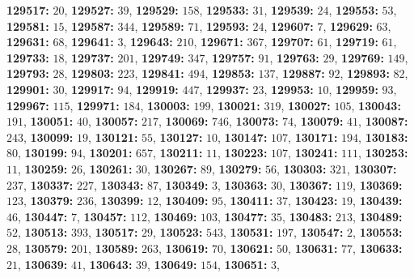 \textsf{\bfseries 129517:} $20$, \textsf{\bfseries 129527:} $39$, \textsf{\bfseries 129529:} $158$, \textsf{\bfseries 129533:} $31$, \textsf{\bfseries 129539:} $24$, \textsf{\bfseries 129553:} $53$, \textsf{\bfseries 129581:} $15$, \textsf{\bfseries 129587:} $344$, \textsf{\bfseries 129589:} $71$, \textsf{\bfseries 129593:} $24$, \textsf{\bfseries 129607:} $7$, \textsf{\bfseries 129629:} $63$, \textsf{\bfseries 129631:} $68$, \textsf{\bfseries 129641:} $3$, \textsf{\bfseries 129643:} $210$, \textsf{\bfseries 129671:} $367$, \textsf{\bfseries 129707:} $61$, \textsf{\bfseries 129719:} $61$, \textsf{\bfseries 129733:} $18$, \textsf{\bfseries 129737:} $201$, \textsf{\bfseries 129749:} $347$, \textsf{\bfseries 129757:} $91$, \textsf{\bfseries 129763:} $29$, \textsf{\bfseries 129769:} $149$, \textsf{\bfseries 129793:} $28$, \textsf{\bfseries 129803:} $223$, \textsf{\bfseries 129841:} $494$, \textsf{\bfseries 129853:} $137$, \textsf{\bfseries 129887:} $92$, \textsf{\bfseries 129893:} $82$, \textsf{\bfseries 129901:} $30$, \textsf{\bfseries 129917:} $94$, \textsf{\bfseries 129919:} $447$, \textsf{\bfseries 129937:} $23$, \textsf{\bfseries 129953:} $10$, \textsf{\bfseries 129959:} $93$, \textsf{\bfseries 129967:} $115$, \textsf{\bfseries 129971:} $184$, \textsf{\bfseries 130003:} $199$, \textsf{\bfseries 130021:} $319$, \textsf{\bfseries 130027:} $105$, \textsf{\bfseries 130043:} $191$, \textsf{\bfseries 130051:} $40$, \textsf{\bfseries 130057:} $217$, \textsf{\bfseries 130069:} $746$, \textsf{\bfseries 130073:} $74$, \textsf{\bfseries 130079:} $41$, \textsf{\bfseries 130087:} $243$, \textsf{\bfseries 130099:} $19$, \textsf{\bfseries 130121:} $55$, \textsf{\bfseries 130127:} $10$, \textsf{\bfseries 130147:} $107$, \textsf{\bfseries 130171:} $194$, \textsf{\bfseries 130183:} $80$, \textsf{\bfseries 130199:} $94$, \textsf{\bfseries 130201:} $657$, \textsf{\bfseries 130211:} $11$, \textsf{\bfseries 130223:} $107$, \textsf{\bfseries 130241:} $111$, \textsf{\bfseries 130253:} $11$, \textsf{\bfseries 130259:} $26$, \textsf{\bfseries 130261:} $30$, \textsf{\bfseries 130267:} $89$, \textsf{\bfseries 130279:} $56$, \textsf{\bfseries 130303:} $321$, \textsf{\bfseries 130307:} $237$, \textsf{\bfseries 130337:} $227$, \textsf{\bfseries 130343:} $87$, \textsf{\bfseries 130349:} $3$, \textsf{\bfseries 130363:} $30$, \textsf{\bfseries 130367:} $119$, \textsf{\bfseries 130369:} $123$, \textsf{\bfseries 130379:} $236$, \textsf{\bfseries 130399:} $12$, \textsf{\bfseries 130409:} $95$, \textsf{\bfseries 130411:} $37$, \textsf{\bfseries 130423:} $19$, \textsf{\bfseries 130439:} $46$, \textsf{\bfseries 130447:} $7$, \textsf{\bfseries 130457:} $112$, \textsf{\bfseries 130469:} $103$, \textsf{\bfseries 130477:} $35$, \textsf{\bfseries 130483:} $213$, \textsf{\bfseries 130489:} $52$, \textsf{\bfseries 130513:} $393$, \textsf{\bfseries 130517:} $29$, \textsf{\bfseries 130523:} $543$, \textsf{\bfseries 130531:} $197$, \textsf{\bfseries 130547:} $2$, \textsf{\bfseries 130553:} $28$, \textsf{\bfseries 130579:} $201$, \textsf{\bfseries 130589:} $263$, \textsf{\bfseries 130619:} $70$, \textsf{\bfseries 130621:} $50$, \textsf{\bfseries 130631:} $77$, \textsf{\bfseries 130633:} $21$, \textsf{\bfseries 130639:} $41$, \textsf{\bfseries 130643:} $39$, \textsf{\bfseries 130649:} $154$, \textsf{\bfseries 130651:} $3$, 
